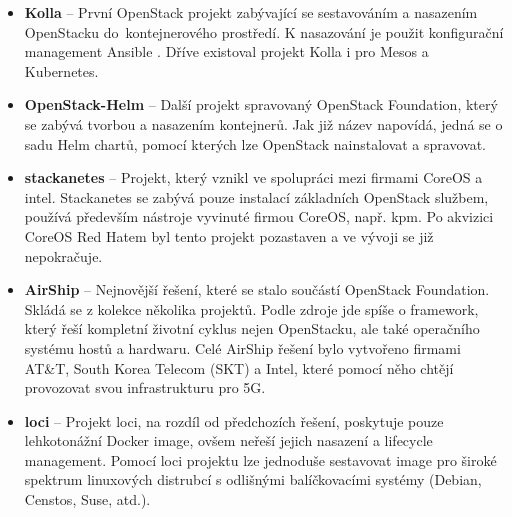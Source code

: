 \begin{itemize}
\item \textbf{Kolla} – První OpenStack projekt zabývající se sestavováním a nasazením OpenStacku do kontejnerového prostředí. K nasazování je použit konfigurační management Ansible \cite{kolla_ansible}. Dříve existoval projekt Kolla i pro Mesos a Kubernetes.
\item \textbf{OpenStack-Helm} – Další projekt spravovaný OpenStack Foundation, který se zabývá tvorbou a nasazením kontejnerů. Jak již název napovídá, jedná se o sadu Helm chartů, pomocí kterých lze OpenStack nainstalovat a spravovat.
\item \textbf{stackanetes} – Projekt, který vznikl ve spolupráci mezi firmami CoreOS a intel. Stackanetes se zabývá pouze instalací základních OpenStack službem, používá především nástroje vyvinuté firmou CoreOS, např. kpm. Po akvizici CoreOS Red Hatem byl tento projekt pozastaven a ve vývoji se již nepokračuje.
\item \textbf{AirShip} – Nejnovější řešení, které se stalo součástí OpenStack Foundation. Skládá se z kolekce několika projektů. Podle zdroje \cite{airship} jde spíše o framework, který řeší kompletní životní cyklus nejen OpenStacku, ale také operačního systému hostů a hardwaru. Celé AirShip řešení bylo vytvořeno firmami AT\&T, South Korea Telecom (SKT) a Intel, které pomocí něho chtějí provozovat svou infrastrukturu pro 5G.
\item \textbf{loci} – Projekt loci, na rozdíl od předchozích řešení, poskytuje pouze lehkotonážní Docker image, ovšem neřeší jejich nasazení a lifecycle management. Pomocí loci projektu lze jednoduše sestavovat image pro široké spektrum linuxových distrubcí s odlišnými balíčkovacími systémy (Debian, Censtos, Suse, atd.).
\end{itemize}

